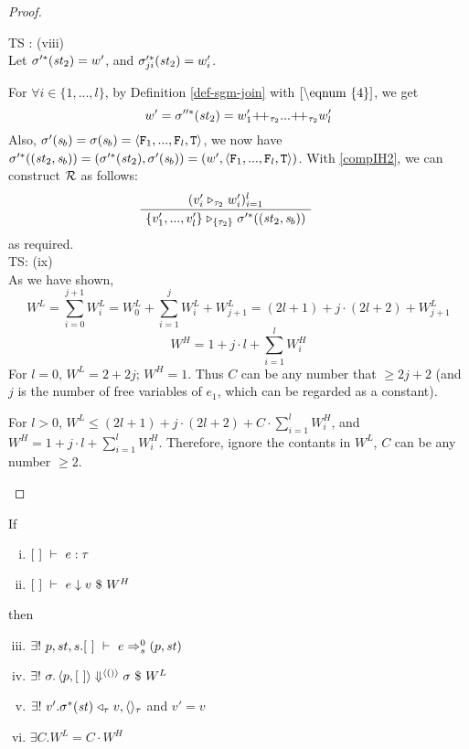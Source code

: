 \begin{proof}
\begin{itemize}
\begin{enumerate}[(i)]
\begin{itemize}
	TS : (viii)  \\
	Let $\sigma'^*(\mathit{st}_2) = w'$, and $\sigma'^*_{ji}(\mathit{st}_2) = w'_i$. 
	 
	For $\forall i \in \{1,...,l\}$, by Definition \ref{def-sgm-join} with $\eqref{\eqnum{4}}$, we get
	$$w' = \sgm''^*(\st_2) = w'_1 {\++}_{\tau_2} ... {\++}_{\tau_2} w'_l$$
	Also, $\sgm'(\s_b) = \sgm(\s_b) = \stwo$,
	we now have $\sgm'^*((\st_2,\s_b)) = (\sgm'^*(\st_2),\sgm'(\s_b)) = (w',\stwo)$. 
	With \eqref{compIH2}, we can construct $\mathcal{R}$ as follows:
	$$\PT{
		\AC{(\ValRep{v'_i}{\tau_2}{w'_i})^l_{i=1}}
		\UC{\ValRep{\Seql{v'}}{\tseq{\tau_2}}{\sgm'^*((\st_2,\s_b))}}
	}$$ as required. \\
	
	TS: (ix) \\
	As we have shown, $$W^L =  \sum_{i=0}^{j+1} W^L_i = W^L_0 + \sum_{i=1}^{j}W^L_i + W^L_{j+1} = (2l+1) +  j\cdot (2l+2) + W^L_{j+1} $$
	$$W^H = 1 + j \cdot l + \sum_{i=1}^{l} W^H_i$$ 
	For $l=0$, 	$W^L = 2 + 2j$; $W^H = 1$. Thus $C$ can be any number that $ \ge 2j+2$ (and $j$ is the number of free variables of $e_1$, which can be regarded as a constant).
    	 
	For $l>0$, $W^L \le (2l+1) + j\cdot (2l+2) + C \cdot \sum_{i=1}^{l}W^H_i $,
	and $W^H = 1 + j \cdot l + \sum_{i=1}^{l}W^H_i$. Therefore, ignore the contants in $W^L$,  $C $ can be any number $\ge 2$.
	
	\end{itemize}

	\end{enumerate}

	\end{itemize}	
\end{proof}


\begin{cor}
	If 
	\begin{enumerate}[(i)]
		\item $[\ ] \ \vdash\  e : \tau$
		\item $\Eval{[\ ]}{e}{v}{W^H}$
	\end{enumerate}
then 
\begin{enumerate}[(i)]
	\setcounter{enumi}{2}
	\item $\exists! \ p,st,s . \Trans{[\ ]}{e}{0}{s}{(p,\st)}$
	\item $\exists! \ \sgm. \seval{p}{[\ ]}{\vunit}{\sgm}{W^L} $
	\item $\exists! \ v'. \sigma^*(\mathit{st}) \mathrel{\triangleleft_{\tau}} v,\langle \rangle_{\tau} $ and $v' = v$
	\item $ \exists C . W^L = C \cdot W^H$ 
	 
\end{enumerate}
\end{cor}


